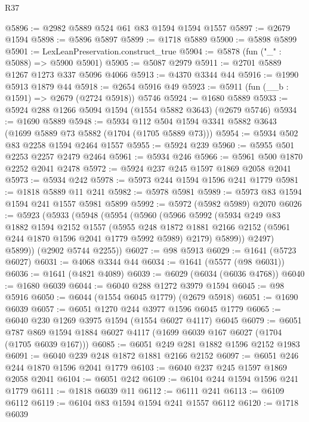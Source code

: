 \begin{lexlean}{R37}
\begin{coremodule}
@5896 := @2982 @5889 @524 @61 @83 @1594 @1594 @1557
@5897 := @2679 @1594
@5898 := @5896 @5897
@5899 := @1718 @5889
@5900 := @5898 @5899
@5901 := LexLeanPreservation.construct_true
@5904 := @5878 (fun ("_" : @5088) => @5900 @5901)
@5905 := @5087 @2979
@5911 := @2701 @5889 @1267 @1273 @337 @5096 @4066
@5913 := @4370 @3344 @44
@5916 := @1990 @5913 @1879 @44
@5918 := @2654 @5916 @49
@5923 := @5911 (fun (__b : @1591) => @2679 (@2724 @5918)) @5746
@5924 := @1680 @5889
@5933 := @5924 @288 @1266 @5094 @1594 (@1554 @5882 @3643) (@2679 @5746)
@5934 := @1690 @5889
@5948 := @5934 @112 @504 @1594 @3341 @5882 @3643 (@1699 @5889 @73 @5882 (@1704 (@1705 @5889 @73)))
@5954 := @5934 @502 @83 @2258 @1594 @2464 @1557
@5955 := @5924 @239
@5960 := @5955 @501 @2253 @2257 @2479 @2464
@5961 := @5934 @246
@5966 := @5961 @500 @1870 @2252 @2041 @2478
@5972 := @5924 @237 @245 @1597 @1869 @2058 @2041
@5973 := @5934 @242
@5978 := @5973 @244 @1594 @1596 @241 @1779
@5981 := @1818 @5889 @11 @241
@5982 := @5978 @5981
@5989 := @5973 @83 @1594 @1594 @241 @1557 @5981 @5899
@5992 := @5972 (@5982 @5989) @2070
@6026 := @5923
    (@5933
      (@5948
        (@5954
          (@5960
            (@5966
              @5992
              (@5934
                @249
                @83
                @1882
                @1594
                @2152
                @1557
                (@5955
                  @248
                  @1872
                  @1881
                  @2166
                  @2152
                  (@5961 @244 @1870 @1596 @2041 @1779 @5992 @5989)
                  @2179)
                @5899))
            @2497)
          @5899))
      (@2902 @5744 @2255))
@6027 := @98 @5913
@6029 := @1641 (@5723 @6027)
@6031 := @4068 @3344 @44
@6034 := @1641 (@5577 (@98 @6031))
@6036 := @1641 (@4821 @4089)
@6039 := @6029 (@6034 (@6036 @4768))
@6040 := @1680 @6039
@6044 := @6040 @288 @1272 @3979 @1594
@6045 := @98 @5916
@6050 := @6044 (@1554 @6045 @1779) (@2679 @5918)
@6051 := @1690 @6039
@6057 := @6051 @1270 @244 @3977 @1596 @6045 @1779
@6065 := @6040 @230 @1269 @3975 @1594 (@1554 @6027 @4117) @6045
@6079 := @6051 @787 @869 @1594 @1884 @6027 @4117 (@1699 @6039 @167 @6027 (@1704 (@1705 @6039 @167)))
@6085 := @6051 @249 @281 @1882 @1596 @2152 @1983
@6091 := @6040 @239 @248 @1872 @1881 @2166 @2152
@6097 := @6051 @246 @244 @1870 @1596 @2041 @1779
@6103 := @6040 @237 @245 @1597 @1869 @2058 @2041
@6104 := @6051 @242
@6109 := @6104 @244 @1594 @1596 @241 @1779
@6111 := @1818 @6039 @11
@6112 := @6111 @241
@6113 := @6109 @6112
@6119 := @6104 @83 @1594 @1594 @241 @1557 @6112
@6120 := @1718 @6039

\end{coremodule}
\end{lexlean}
